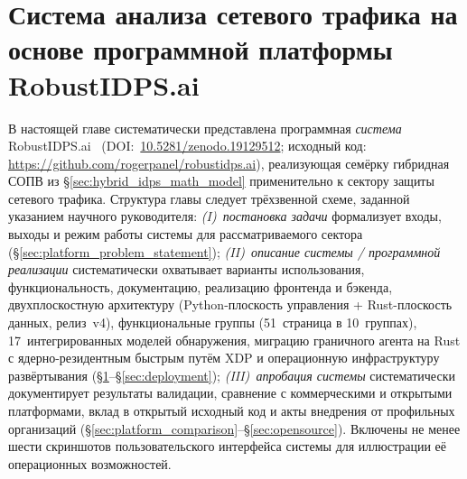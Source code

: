 
\chapter{Система анализа сетевого трафика на основе программной платформы RobustIDPS.ai}
\label{ch:platform}

В настоящей главе систематически представлена программная
\emph{система} \textsf{RobustIDPS.ai}~\cite{Anaedevha2026robustidps}
(DOI:~\url{10.5281/zenodo.19129512}; исходный код:
\url{https://github.com/rogerpanel/robustidps.ai}), реализующая
семёрку гибридная СОПВ из \S\ref{sec:hybrid_idps_math_model}
применительно к сектору защиты сетевого трафика. Структура главы
следует трёхзвенной схеме, заданной указанием научного руководителя:
\emph{(I)~постановка задачи} формализует входы, выходы и режим
работы системы для рассматриваемого сектора
(\S\ref{sec:platform_problem_statement}); \emph{(II)~описание
системы / программной реализации} систематически охватывает
варианты использования, функциональность, документацию, реализацию
фронтенда и бэкенда, двухплоскостную архитектуру (Python-плоскость
управления + Rust-плоскость данных, релиз~v4), функциональные
группы (51~страница в 10~группах), 17~интегрированных моделей
обнаружения, миграцию граничного агента на Rust с ядерно-резидентным
быстрым путём XDP и операционную инфраструктуру развёртывания
(\S\ref{ch:platform}--\S\ref{sec:deployment});
\emph{(III)~апробация системы} систематически документирует
результаты валидации, сравнение с коммерческими и открытыми
платформами, вклад в открытый исходный код и акты внедрения от
профильных организаций
(\S\ref{sec:platform_comparison}--\S\ref{sec:opensource}).
Включены не менее шести скриншотов пользовательского интерфейса
системы для иллюстрации её операционных возможностей.

